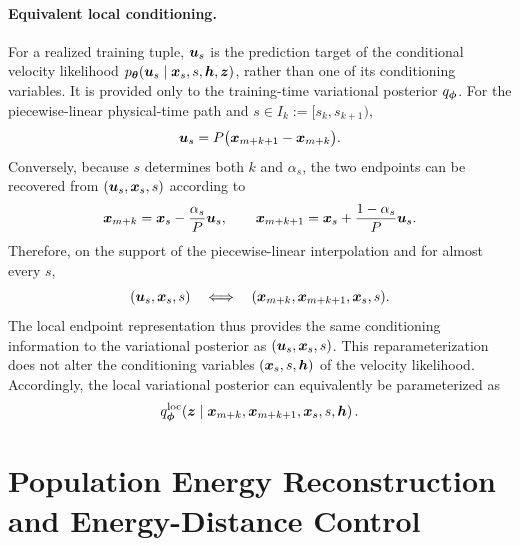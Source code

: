 \paragraph{Equivalent local conditioning.}
For a realized training tuple, ${\bm{u}}_s$ is the prediction target of the
conditional velocity likelihood
$p_{{\bm{\theta}}}({\bm{u}}_s\mid{\bm{x}}_s,s,{\bm{h}},{\bm{z}})$, rather than one of its
conditioning variables. It is provided only to the training-time variational
posterior $q_{\boldsymbol{\phi}}$. For the piecewise-linear physical-time path and
$s\in I_k := [s_k, s_{k+1})$,
\begin{equation}
  {\bm{u}}_s
  =
  P\bigl({\bm{x}}_{m+k+1}-{\bm{x}}_{m+k}\bigr).
  \label{eq:local_velocity_endpoints}
\end{equation}
Conversely, because $s$ determines both $k$ and $\alpha_s$, the two endpoints
can be recovered from $({\bm{u}}_s,{\bm{x}}_s,s)$ according to
\begin{equation}
  {\bm{x}}_{m+k}
  =
  {\bm{x}}_s-\frac{\alpha_s}{P}{\bm{u}}_s,
  \qquad
  {\bm{x}}_{m+k+1}
  =
  {\bm{x}}_s+\frac{1-\alpha_s}{P}{\bm{u}}_s.
  \label{eq:recover_local_endpoints}
\end{equation}
Therefore, on the support of the piecewise-linear interpolation and for almost
every $s$,
\begin{equation}
  ({\bm{u}}_s,{\bm{x}}_s,s)
  \quad\Longleftrightarrow\quad
  ({\bm{x}}_{m+k},{\bm{x}}_{m+k+1},{\bm{x}}_s,s).
  \label{eq:local_evidence_equivalence}
\end{equation}
The local endpoint representation thus provides the same conditioning
information to the variational posterior as $({\bm{u}}_s,{\bm{x}}_s,s)$. This
reparameterization does not alter the conditioning variables
$({\bm{x}}_s,s,{\bm{h}})$ of the velocity likelihood. Accordingly, the local
variational posterior can equivalently be parameterized as
\begin{equation}
  q_{\boldsymbol{\phi}}^{\mathrm{loc}}\!\left(
    {\bm{z}}
    \mid
    {\bm{x}}_{m+k},
    {\bm{x}}_{m+k+1},
    {\bm{x}}_s,
    s,
    {\bm{h}}
  \right).
  \label{eq:local_variational_encoder}
\end{equation}


\clearpage

\section{Population Energy Reconstruction and Energy-Distance Control}
\label{sec:population_energy_control}

